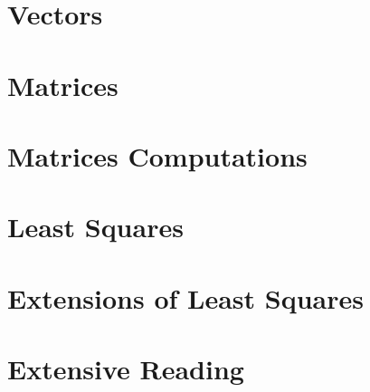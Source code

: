 \ifdefined\printmath

\part{Vectors}







\part{Matrices}



\part{Matrices Computations}





\part{Least Squares}



\part{Extensions of Least Squares}




\part{Extensive Reading}




% 
% 
% 

% 

